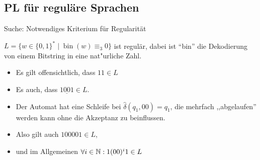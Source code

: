 \subsection{\acf{PL} für reguläre Sprachen} %
Suche: Notwendiges Kriterium für Regularität
\begin{Bsp*}
                $L = \{ w\in \{0,1\}^* \mid \operatorname{bin}(w)\equiv_3 0\}$ ist regulär, dabei ist "`bin"' die Dekodierung von einem Bitstring in eine nat"urliche Zahl.
    \begin{center}
  \end{center}
  \begin{itemize}
  \item Es gilt offensichtlich, dass $11 \in L$
  \item Es auch, dass $1 \underline{0 0} 1 \in L$.
  \item Der Automat hat eine Schleife bei $\hat\delta({q_1,00}) = q_1$, die mehrfach ,,abgelaufen'' werden kann ohne die Akzeptanz zu beinflussen.
  \item Also gilt auch $100001 \in L$,
  \item und im Allgemeinen $\forall i\in\mathbb{N}: 1(00)^i1 \in L$
  \end{itemize}
\end{Bsp*}

